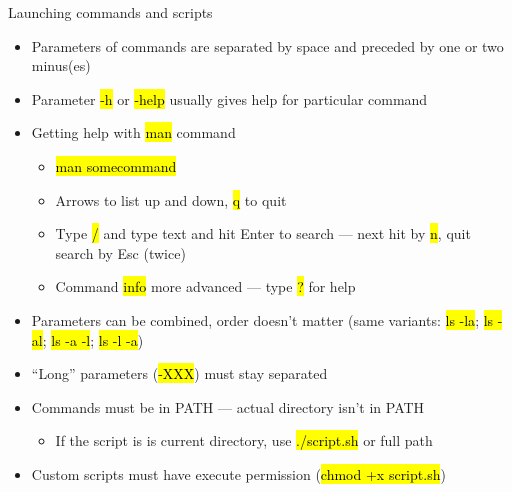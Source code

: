 \documentclass[compress, ucs, xelatex, 11pt, xcolor=svgnames,
  hyperref={
    bookmarks=true,
    unicode=true,
    colorlinks=true,
    pdftitle={Linux, command line and MetaCentrum},
    plainpages=false,
    pdfauthor={Vojtech Zeisek},
    pdfsubject={Course about use of Linux command line, writing shell scripts and using MetaCentrum of CESNET},
    pdfcreator={XeLaTeX, http://www.xelatex.org/},
    pdfkeywords={Linux, GNU, BASH, shell, command line, MetaCentrum},
    linkcolor=Sienna,
    anchorcolor=black,
    citecolor=green,
    filecolor=magenta,
    menucolor=Sienna,
    urlcolor=cyan,
    pdftex},
  url={hyphens, lowtilde} %
  ]{beamer}
\renewcommand{\texttt}[1]{\hl{\ttfamily #1}}
\begin{document}
\begin{frame}{Launching commands and scripts}
\begin{itemize}
  \item Parameters of commands are separated by space and preceded by one or two minus(es)
  \item Parameter \texttt{-h} or \texttt{{-}-help} usually gives help for particular command
  \item Getting help with \texttt{man} command
  \begin{itemize}
    \item \texttt{man somecommand}
    \item Arrows to list up and down, \texttt{q} to quit
    \item Type \texttt{/} and type text and hit Enter to search --- next hit by \texttt{n}, quit search by Esc (twice)
    \item Command \texttt{info} more advanced --- type \texttt{?} for help
  \end{itemize}
  \item Parameters can be combined, order doesn't matter (same variants: \texttt{ls -la}; \texttt{ls -al}; \texttt{ls -a -l}; \texttt{ls -l -a})
  \item ``Long'' parameters (\texttt{{-}-XXX}) must stay separated
  \item Commands must be in PATH --- actual directory isn't in PATH
  \begin{itemize}
    \item If the script is is current directory, use \texttt{./script.sh} or full path
  \end{itemize}
  \item Custom scripts must have execute permission (\texttt{chmod +x script.sh})
\end{itemize}
\end{frame}
\end{document}
